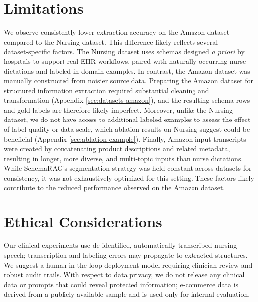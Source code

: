 \documentclass[11pt]{article}
\begin{document}
\section{Limitations}
\label{sec:limitations}
We observe consistently lower extraction accuracy on the Amazon dataset compared to the Nursing dataset. This difference likely reflects several dataset‑specific factors. The Nursing dataset uses schemas designed \textit{a priori} by hospitals to support real EHR workflows, paired with naturally occurring nurse dictations and labeled in‑domain examples. In contrast, the Amazon dataset was manually constructed from noisier source data.
Preparing the Amazon dataset for structured information extraction required substantial cleaning and transformation (Appendix \ref{sec:datasets-amazon}), and the resulting schema rows and gold labels are therefore likely imperfect. Moreover, unlike the Nursing dataset, we do not have access to additional labeled examples to assess the effect of label quality or data scale, which ablation results on Nursing suggest could be beneficial (Appendix \ref{sec:ablation-example}).
Finally, Amazon input transcripts were created by concatenating product descriptions and related metadata, resulting in longer, more diverse, and multi‑topic inputs than nurse dictations. While SchemaRAG’s segmentation strategy was held constant across datasets for consistency, it was not exhaustively optimized for this setting. These factors likely contribute to the reduced performance observed on the Amazon dataset.

\section*{Ethical Considerations}
Our clinical experiments use de‑identified, automatically transcribed nursing speech; transcription and labeling errors may propagate to extracted structures.  
We suggest a human-in-the-loop deployment model requiring clinician review and robust audit trails.
With respect to data privacy, we do not release any clinical data or prompts that could reveal protected information; e‑commerce data is derived from a publicly available sample and is used only for internal evaluation. 

\end{document}
